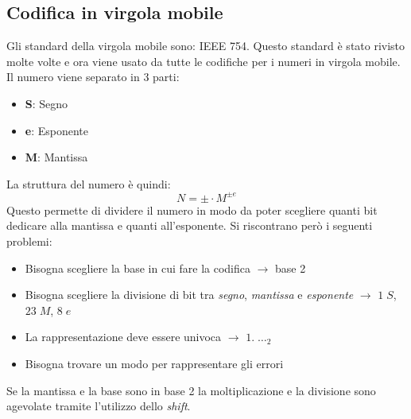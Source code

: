 \documentclass[a4paper]{article}
\theoremstyle{break}
\theoremstyle{break}
\theoremstyle{break}
\theoremstyle{break}
\begin{document}
\subsection{Codifica in virgola mobile}
Gli standard della virgola mobile sono: IEEE 754. Questo standard
è stato rivisto molte volte e ora viene usato da tutte le codifiche per i numeri in
virgola mobile.\\
Il numero viene separato in 3 parti:
\begin{itemize}
    \item \textbf{S}: Segno
    \item \textbf{e}: Esponente
	\item \textbf{M}: Mantissa
\end{itemize}
La struttura del numero è quindi:
\[
	N = \pm \cdot M^{\pm e}
\]
Questo permette di dividere il numero in modo da poter scegliere quanti bit dedicare
alla mantissa e quanti all'esponente. Si riscontrano però i seguenti problemi:
\begin{itemize}
	\item Bisogna scegliere la base in cui fare la codifica \(\to\)  base 2
	\item Bisogna scegliere la divisione di bit tra \emph{segno}, \emph{mantissa} e \emph{esponente} \( \to \)   \( 1\; S \), \( 23\; M \), \( 8\; e \)
	\item La rappresentazione deve essere univoca \( \to \)  \( 1.\; \ldots_2 \)
	\item Bisogna trovare un modo per rappresentare gli errori
\end{itemize}
Se la mantissa e la base sono in base 2 la moltiplicazione e la
divisione sono agevolate tramite l'utilizzo dello \emph{shift}.
\end{document}
